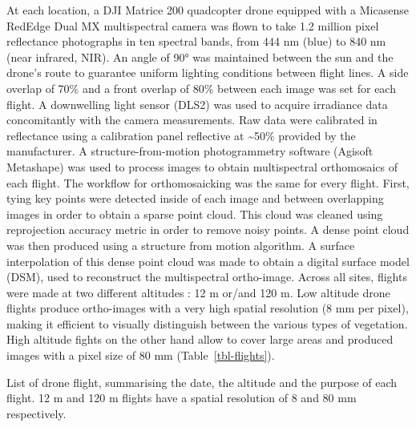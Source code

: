 \documentclass[
  number]{elsarticle}
\begin{document}
At each location, a DJI Matrice 200 quadcopter drone equipped with a
Micasense RedEdge Dual MX multispectral camera was flown to take 1.2
million pixel reflectance photographs in ten spectral bands, from 444 nm
(blue) to 840 nm (near infrared, NIR). An angle of 90° was maintained
between the sun and the drone's route to guarantee uniform lighting
conditions between flight lines. A side overlap of 70\% and a front
overlap of 80\% between each image was set for each flight. A
downwelling light sensor (DLS2) was used to acquire irradiance data
concomitantly with the camera measurements. Raw data were calibrated in
reflectance using a calibration panel reflective at \textasciitilde50\%
provided by the manufacturer. A structure-from-motion photogrammetry
software (Agisoft Metashape) was used to process images to obtain
multispectral orthomosaics of each flight. The workflow for
orthomosaicking was the same for every flight. First, tying key points
were detected inside of each image and between overlapping images in
order to obtain a sparse point cloud. This cloud was cleaned using
reprojection accuracy metric in order to remove noisy points. A dense
point cloud was then produced using a structure from motion algorithm. A
surface interpolation of this dense point cloud was made to obtain a
digital surface model (DSM), used to reconstruct the multispectral
ortho-image. Across all sites, flights were made at two different
altitudes : 12 m or/and 120 m. Low altitude drone flights produce
ortho-images with a very high spatial resolution (8 mm per pixel),
making it efficient to visually distinguish between the various types of
vegetation. High altitude fights on the other hand allow to cover large
areas and produced images with a pixel size of 80 mm
(Table~\ref{tbl-flights}).

\begin{table}

\caption{\label{tbl-flights}List of drone flight, summarising the date,
the altitude and the purpose of each flight. 12 m and 120 m flights have
a spatial resolution of 8 and 80 mm respectively.}


\end{table}%
\end{document}
